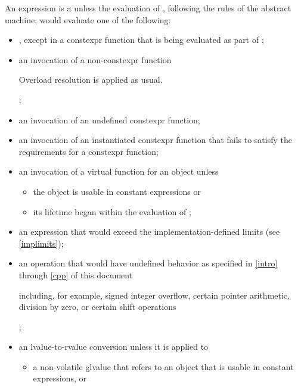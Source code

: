 \pnum
An expression  is a 
unless the evaluation of , following the rules of the abstract
machine, would evaluate one of the following:
\begin{itemize}
\item
{}, except in a constexpr
function that is being evaluated as part
of ;

\item
an invocation of a non-constexpr function
\begin{note}
Overload resolution
is applied as usual.
\end{note}%
;

\item
an invocation of an undefined constexpr function;

\item
an invocation of an instantiated constexpr function
that fails to satisfy the requirements
for a constexpr function;

\item
an invocation of a virtual function
for an object unless
  \begin{itemize}
  \item the object is usable in constant expressions or
  \item its lifetime began within the evaluation of ;
  \end{itemize}

\item
an expression that would exceed the implementation-defined
limits (see \ref{implimits});

\item
an operation that would have undefined behavior
as specified in \ref{intro} through \ref{cpp}
of this document
\begin{note}
including,
for example, signed integer overflow, certain
pointer arithmetic, division by
zero, or certain shift operations
\end{note}%
;

\item
an lvalue-to-rvalue conversion unless
it is applied to
\begin{itemize}
  \item
  a non-volatile glvalue that refers to an object that is
  usable in constant expressions, or


\end{itemize}
\end{itemize}
